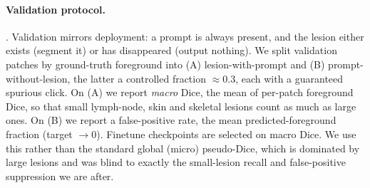 \paragraph{Validation protocol.} . Validation mirrors deployment: a prompt is always
present, and the lesion either exists (segment it) or has disappeared (output
nothing). We split validation patches by ground-truth foreground into (A)
lesion-with-prompt and (B) prompt-without-lesion, the latter a controlled fraction
$\approx0.3$, each with a guaranteed spurious click. On (A) we report \emph{macro}
Dice, the mean of per-patch foreground Dice, so that small lymph-node, skin and
skeletal lesions count as much as large ones. On (B) we report a false-positive
rate, the mean predicted-foreground fraction (target $\to0$). Finetune checkpoints
are selected on macro Dice. We use this rather than the standard global (micro)
pseudo-Dice, which is dominated by large lesions and was blind to exactly the
small-lesion recall and false-positive suppression we are after.
 
